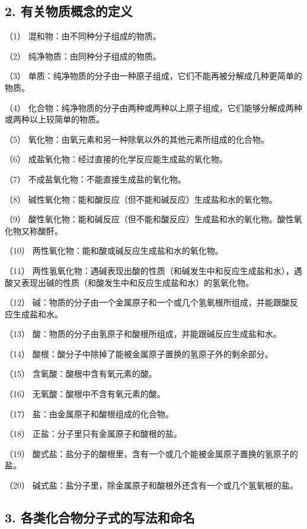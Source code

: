 \subsection{2. 有关物质概念的定义}

（1） 混和物：由不同种分子组成的物质。

（2） 纯净物质：由同种分子组成的物质。

（3）
单质：纯净物质的分子由一种原子组成，它们不能再被分解成几种更简单的物质。

（4）
化合物：纯净物质的分子由两种或两种以上原子组成，它们能够分解成两种或两种以上较简单的物质。

（5） 氧化物：由氧元素和另一种除氧以外的其他元素所组成的化合物。

（6） 成盐氧化物：经过直接的化学反应能生成盐的氧化物。

（7） 不成盐氧化物：不能直接生成盐的氧化物。

（8） 碱性氧化物：能和酸反应（但不能和碱反应）生成盐和水的氧化物。

（9）
酸性氧化物：能和碱反应（但不能和酸反应）生成盐和水的氧化物。酸性氧化物又称酸酐。

（10） 两性氧化物：能和酸或碱反应生成盐和水的氧化物。

（11）
两性氢氧化物：遇碱表现出酸的性质（和碱发生中和反应生成盐和水），遇酸又表现出碱的性质（和酸发生中和反应生成盐和水）的氢氧化物。

（12）
碱：物质的分子由一个金属原子和一个或几个氢氧根所组成，并能跟酸反应生成盐和水。

（13） 酸：物质的分子由氢原子和酸根所组成，并能跟碱反应生成盐和水。

（14） 酸根：酸分子中除掉了能被金属原子置换的氢原子外的剩余部分。

（15） 含氧酸：酸根中含有氧元素的酸。

（16） 无氧酸：酸根中不含有氧元素的酸。

（17） 盐：由金属原子和酸根组成的化合物。

（18） 正盐：分子里只有金属原子和酸根的盐。

（19）
酸式盐：盐分子的酸根里，含有一个或几个能被金属原子置换的氢原子的盐。

（20） 碱式盐：盐分子里，除金属原子和酸根外还含有一个或几个氢氧根的盐。

\subsection{3. 各类化合物分子式的写法和命名}

